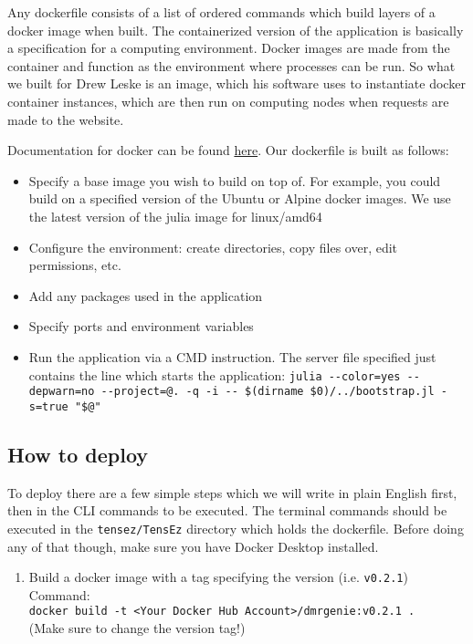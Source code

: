 \documentclass{article}
\begin{document}
\begin{multicols}{2}
Any dockerfile consists of a list of ordered commands which build layers of a docker image when built. The containerized version of the application is basically a specification for a computing environment. Docker images are made from the container and function as the environment where processes can be run. So what we built for Drew Leske is an image, which his software uses to instantiate docker container instances, which are then run on computing nodes when requests are made to the website.

Documentation for docker can be found \href{https://docs.docker.com/}{here}. Our dockerfile is built as follows:

\begin{itemize}
  \item Specify a base image you wish to build on top of. For example, you could build on a specified version of the Ubuntu or Alpine docker images. We use the latest version of the julia image for linux/amd64
  \item Configure the environment: create directories, copy files over, edit permissions, etc.
  \item Add any packages used in the application
  \item Specify ports and environment variables
  \item Run the application via a CMD instruction. The server file specified just contains the line which starts the application: \lstinline|julia --color=yes --depwarn=no --project=@. -q -i -- $(dirname $0)/../bootstrap.jl -s=true "$@"|
\end{itemize}


\subsection{How to deploy}

To deploy there are a few simple steps which we will write in plain English first, then in the CLI commands to be executed. The terminal commands should be executed in the \lstinline|tensez/TensEz| directory which holds the dockerfile. Before doing any of that though, make sure you have Docker Desktop installed.

\begin{enumerate}
  \item Build a docker image with a tag specifying the version (i.e. \lstinline|v0.2.1|)\\
  Command:\\
  \lstinline|docker build -t <Your Docker Hub Account>/dmrgenie:v0.2.1 .| \\(Make sure to change the version tag!)
  

\end{enumerate}
\end{multicols}
\end{document}
